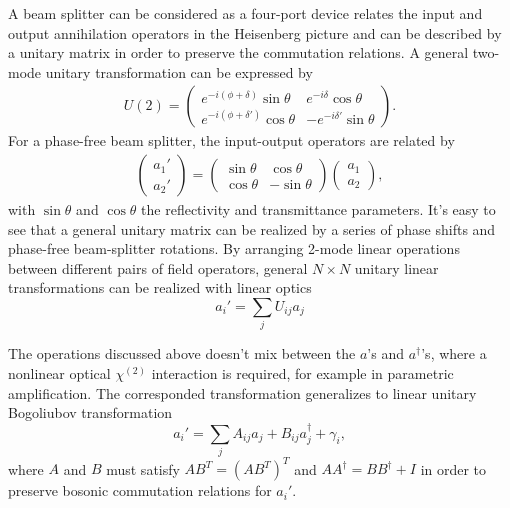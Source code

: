 \documentclass[%
 reprint,
groupedaddress,
showpacs,
 amsmath,amssymb,
 aps,
prb,
]{revtex4-1}
\begin{document}
		A beam splitter can be considered as a four-port device relates the input and output annihilation operators in the Heisenberg picture and can be described by a unitary matrix in order to preserve the commutation relations. A general two-mode unitary transformation can be expressed by
		\begin{eqnarray}
			U(2) = \left (\begin{array}{cc}
				e^{-i(\phi +\delta)}\sin \theta & e^{-i \delta} \cos \theta \\
				e^{-i(\phi +\delta')}\cos \theta & -e^{-i \delta'} \sin \theta
			\end{array} \right ).
		\end{eqnarray}
		For a phase-free beam splitter, the input-output operators are related by		
		\begin{eqnarray}
			\left (\begin{array}{c}
				a_1'\\
				a_2'
			\end{array} \right ) = \left (\begin{array}{cc}
				\sin \theta &  \cos \theta \\
				\cos \theta &  -\sin \theta
			\end{array} \right )\left (\begin{array}{c}
				a_1\\
				a_2
			\end{array} \right ),
		\end{eqnarray}
		with $\sin \theta $ and $ \cos \theta $ the reflectivity and transmittance parameters. It's easy to see that a general unitary matrix can be realized by a series of phase shifts and phase-free beam-splitter rotations. By arranging 2-mode linear operations between different pairs of field operators, general $N\times N$ unitary linear transformations can be realized with linear optics\cite{PhysRevLett.73.58}
		\begin{equation}
		a_i' = \sum_j U_{ij} a_j
		\end{equation}

		The operations discussed above doesn't mix between the $a$'s and $a^\dagger$'s, where a nonlinear optical $ \chi^{(2)} $ interaction is required, for example in parametric amplification. The corresponded transformation generalizes to linear unitary Bogoliubov transformation
		\begin{equation}
		a_i' = \sum_j A_{ij}a_j + B_{ij} a^\dagger_j + \gamma_i,
		\end{equation}
		where $A$ and $B$ must satisfy $AB^T = (AB^T)^T$ and $ AA^\dagger = BB^\dagger + I $ in order to preserve bosonic commutation relations for $a_i'$.
\end{document}

